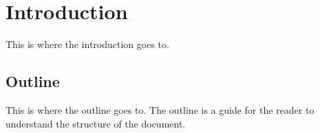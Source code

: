%
%
\chapter{Introduction}\label{chap:introduction}

This is where the introduction goes to.

\section{Outline}\label{sec:outline}

This is where the outline goes to. The outline is a guide for the reader to understand the structure of the document.


